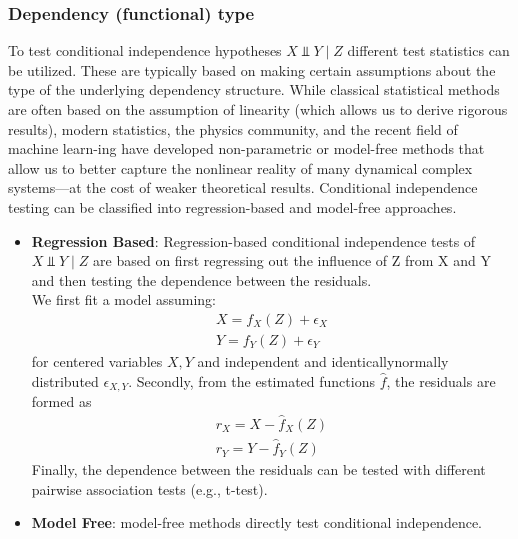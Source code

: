 \subsubsection*{Dependency (functional) type}
To test conditional independence hypotheses $X \Perp Y \;|\; Z$ different test statistics can be utilized.
These are typically based on making certain assumptions about the type of the underlying dependency structure.
While classical statistical methods are often based on the assumption of linearity (which
allows us to derive rigorous results), modern statistics, the physics community, and the recent 
field of machine learn-ing have developed non-parametric or model-free methods that allow us to better 
capture the nonlinear reality of many dynamical complex systems—at the cost of weaker theoretical results.
Conditional independence testing can be classified into regression-based and model-free approaches.\\
\begin{itemize}
    \item \textbf{Regression Based}: Regression-based conditional independence tests of $X\Perp Y\;|\;Z$ are based on 
    first regressing out the influence of Z from X and Y and then testing the dependence between the residuals.\\
    We first fit a model assuming:
    \begin{eqnarray*}
        X=f_X(Z)+\epsilon_X\\
        Y=f_Y(Z)+\epsilon_Y
    \end{eqnarray*}
    for centered variables $X, Y$ and independent and identicallynormally distributed $\epsilon_{X,Y}$.
    Secondly, from the estimated functions $\hat{f}$, the residuals are formed as
    \begin{eqnarray*}
        r_X=X-\hat{f}_X(Z)\\
        r_Y=Y-\hat{f}_Y(Z)
    \end{eqnarray*}
    Finally, the dependence between the residuals can be tested with different pairwise association tests (e.g., t-test).\\
    \item{\textbf{Model Free}}: model-free methods directly test conditional independence.
\end{itemize}

